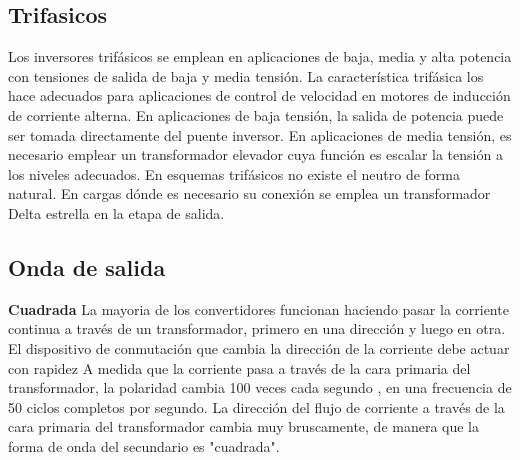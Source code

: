 \documentclass[10pt,letterpaper]{article}
\begin{document}
\subsection{Trifasicos}
Los inversores trifásicos se emplean en aplicaciones de baja, media y alta potencia con tensiones de salida de baja y media tensión.
La característica trifásica los hace adecuados para aplicaciones de control de velocidad en motores de inducción de corriente alterna.
 En aplicaciones de baja tensión, la salida de potencia puede ser tomada directamente del puente inversor. En aplicaciones de media tensión, es necesario emplear un transformador elevador cuya función es escalar la tensión a los niveles adecuados. 
En esquemas trifásicos no existe el neutro de forma natural. En cargas dónde es necesario su conexión se emplea un transformador Delta estrella en la etapa de salida.
\subsection{Onda de salida}
\textbf{Cuadrada}
La mayoria de los convertidores funcionan haciendo pasar la corriente continua a través de un transformador, primero en una dirección y luego en otra.  El dispositivo de conmutación que cambia la dirección de la corriente debe actuar con rapidez A medida que la corriente pasa a través de la cara primaria del transformador, la polaridad cambia 100 veces cada segundo  , en una frecuencia de 50 ciclos completos por segundo.  La dirección del flujo de corriente a través de la cara primaria del transformador cambia muy bruscamente, de manera que la forma de onda del secundario es "cuadrada".
\end{document}
